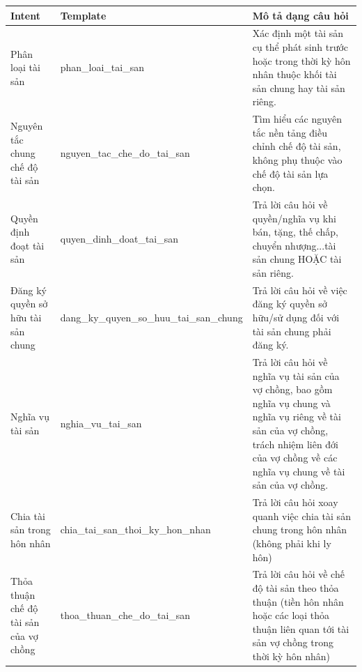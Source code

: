 \documentclass[../DoAn.tex]{subfiles}
\begin{document}
\begin{table}[htbp]
\centering
\footnotesize
\begin{tabularx}{\textwidth}{|>{\raggedright\arraybackslash}p{2.5cm}|>{\raggedright\arraybackslash}p{4.1cm}|>{\raggedright\arraybackslash}X|}
\hline
\textbf{Intent} & \textbf{Template} & \textbf{Mô tả dạng câu hỏi} \\ \hline

Phân loại tài sản &
phan\_\allowbreak loai\_\allowbreak tai\_\allowbreak san &
Xác định một tài sản cụ thể phát sinh trước hoặc trong thời kỳ hôn nhân thuộc khối tài sản chung hay tài sản riêng. \\ \hline

Nguyên tắc chung chế độ tài sản &
nguyen\_\allowbreak tac\_\allowbreak che\_\allowbreak do\_\allowbreak tai\_\allowbreak san &
Tìm hiểu các nguyên tắc nền tảng điều chỉnh chế độ tài sản, không phụ thuộc vào chế độ tài sản lựa chọn.\\ \hline

Quyền định đoạt tài sản&
quyen\_\allowbreak dinh\_\allowbreak doat\_\allowbreak tai\_\allowbreak san &
Trả lời câu hỏi về quyền/nghĩa vụ khi bán, tặng, thế chấp, chuyển nhượng...tài sản chung HOẶC tài sản riêng. \\ \hline

Đăng ký quyền sở hữu tài sản chung &
dang\_\allowbreak ky\_\allowbreak quyen\_\allowbreak so\_\allowbreak huu\_\allowbreak tai\_\allowbreak san\_\allowbreak chung &
Trả lời câu hỏi về việc đăng ký quyền sở hữu/sử dụng đối với tài sản chung phải đăng ký. \\ \hline

Nghĩa vụ tài sản&
nghia\_\allowbreak vu\_\allowbreak tai\_\allowbreak san &
Trả lời câu hỏi về nghĩa vụ tài sản của vợ chồng, bao gồm nghĩa vụ chung và nghĩa vụ riêng về tài sản của vợ chồng, trách nhiệm liên đới của vợ chồng về các nghĩa vụ chung về tài sản của vợ chồng. \\ \hline

Chia tài sản trong hôn nhân &
chia\_\allowbreak tai\_\allowbreak san\_\allowbreak thoi\_\allowbreak ky\_\allowbreak hon\_\allowbreak nhan &
Trả lời câu hỏi xoay quanh việc chia tài sản chung trong hôn nhân (không
phải khi ly hôn) \\ \hline

Thỏa thuận chế độ tài sản của vợ chồng &
thoa\_\allowbreak thuan\_\allowbreak che\_\allowbreak do\_\allowbreak tai\_\allowbreak san &
Trả lời câu hỏi về chế độ tài sản theo thỏa thuận (tiền hôn nhân hoặc các loại thỏa thuận liên quan tới tài sản vợ chồng trong thời kỳ hôn nhân) \\ \hline


\end{tabularx}
\end{table}
\end{document}
